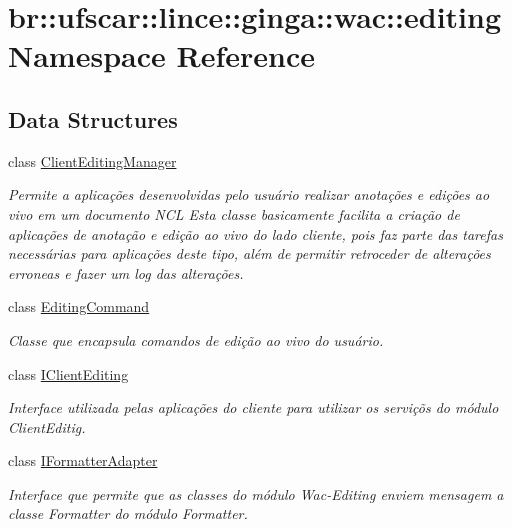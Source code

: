 \hypertarget{namespacebr_1_1ufscar_1_1lince_1_1ginga_1_1wac_1_1editing}{
\section{br::ufscar::lince::ginga::wac::editing Namespace Reference}
\label{namespacebr_1_1ufscar_1_1lince_1_1ginga_1_1wac_1_1editing}
}
\subsection*{Data Structures}
\begin{DoxyCompactItemize}
\item 
class \hyperlink{classbr_1_1ufscar_1_1lince_1_1ginga_1_1wac_1_1editing_1_1ClientEditingManager}{ClientEditingManager}
\begin{DoxyCompactList}\small\item\em Permite a aplicações desenvolvidas pelo usuário realizar anotações e edições ao vivo em um documento NCL Esta classe basicamente facilita a criação de aplicações de anotação e edição ao vivo do lado cliente, pois faz parte das tarefas necessárias para aplicações deste tipo, além de permitir retroceder de alterações erroneas e fazer um log das alterações. \item\end{DoxyCompactList}\item 
class \hyperlink{classbr_1_1ufscar_1_1lince_1_1ginga_1_1wac_1_1editing_1_1EditingCommand}{EditingCommand}
\begin{DoxyCompactList}\small\item\em Classe que encapsula comandos de edição ao vivo do usuário. \item\end{DoxyCompactList}\item 
class \hyperlink{classbr_1_1ufscar_1_1lince_1_1ginga_1_1wac_1_1editing_1_1IClientEditing}{IClientEditing}
\begin{DoxyCompactList}\small\item\em Interface utilizada pelas aplicações do cliente para utilizar os serviçõs do módulo ClientEditig. \item\end{DoxyCompactList}\item 
class \hyperlink{classbr_1_1ufscar_1_1lince_1_1ginga_1_1wac_1_1editing_1_1IFormatterAdapter}{IFormatterAdapter}
\begin{DoxyCompactList}\small\item\em Interface que permite que as classes do módulo Wac-\/Editing enviem mensagem a classe Formatter do módulo Formatter. \item\end{DoxyCompactList}\item 

\end{DoxyCompactItemize}
